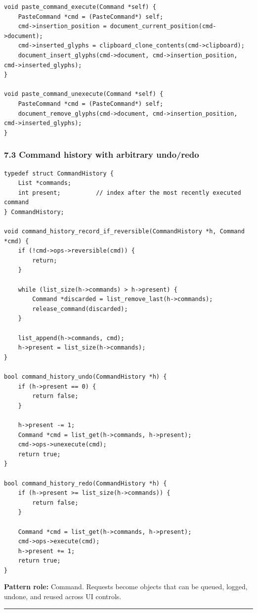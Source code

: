\documentclass[11pt]{article}
\begin{document}
\begin{verbatim}
void paste_command_execute(Command *self) {
    PasteCommand *cmd = (PasteCommand*) self;
    cmd->insertion_position = document_current_position(cmd->document);
    cmd->inserted_glyphs = clipboard_clone_contents(cmd->clipboard);
    document_insert_glyphs(cmd->document, cmd->insertion_position, cmd->inserted_glyphs);
}

void paste_command_unexecute(Command *self) {
    PasteCommand *cmd = (PasteCommand*) self;
    document_remove_glyphs(cmd->document, cmd->insertion_position, cmd->inserted_glyphs);
}
\end{verbatim}

\subsubsection{7.3 Command history with arbitrary undo/redo}\label{command-history-with-arbitrary-undoredo}

\begin{verbatim}
typedef struct CommandHistory {
    List *commands;
    int present;          // index after the most recently executed command
} CommandHistory;

void command_history_record_if_reversible(CommandHistory *h, Command *cmd) {
    if (!cmd->ops->reversible(cmd)) {
        return;
    }

    while (list_size(h->commands) > h->present) {
        Command *discarded = list_remove_last(h->commands);
        release_command(discarded);
    }

    list_append(h->commands, cmd);
    h->present = list_size(h->commands);
}

bool command_history_undo(CommandHistory *h) {
    if (h->present == 0) {
        return false;
    }

    h->present -= 1;
    Command *cmd = list_get(h->commands, h->present);
    cmd->ops->unexecute(cmd);
    return true;
}

bool command_history_redo(CommandHistory *h) {
    if (h->present >= list_size(h->commands)) {
        return false;
    }

    Command *cmd = list_get(h->commands, h->present);
    cmd->ops->execute(cmd);
    h->present += 1;
    return true;
}
\end{verbatim}

\textbf{Pattern role:} Command. Requests become objects that can be queued, logged, undone, and reused across UI controls.

\begin{center}\rule{0.5\linewidth}{0.5pt}\end{center}
\end{document}
